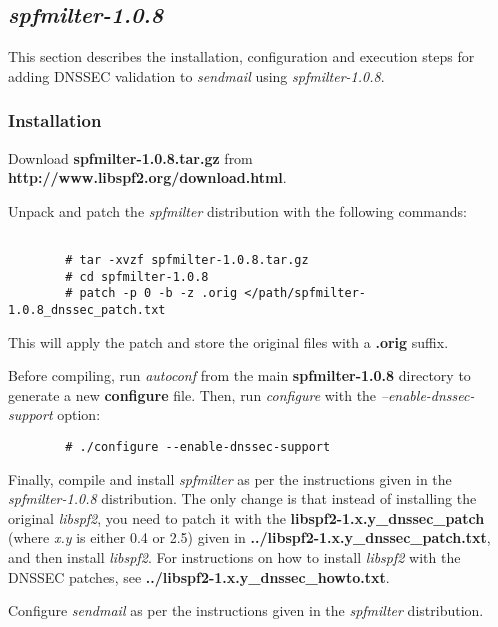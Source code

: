 \documentclass[12pt]{article}
\newcommand{\cmd}[1]{{\em #1}}
\newcommand{\lib}[1]{{\em #1}}
\newcommand{\path}[1]{{\bf #1}}
\newcommand{\url}[1]{{\bf #1}}
\begin{document}

\subsection{\cmd{spfmilter-1.0.8}}

This section describes the installation, configuration and execution steps
for adding DNSSEC validation to \cmd{sendmail} using \cmd{spfmilter-1.0.8}.


\subsubsection{Installation}

Download \path{spfmilter-1.0.8.tar.gz} from
\url{http://www.libspf2.org/download.html}.

Unpack and patch the \cmd{spfmilter} distribution with the following commands:

\begin{verbatim}

        # tar -xvzf spfmilter-1.0.8.tar.gz
        # cd spfmilter-1.0.8
        # patch -p 0 -b -z .orig </path/spfmilter-1.0.8_dnssec_patch.txt
\end{verbatim}

This will apply the patch and store the original files with a \path{.orig}
suffix.

Before compiling, run \cmd{autoconf} from the main \path{spfmilter-1.0.8}
directory to generate a new \path{configure} file.  Then, run \cmd{configure}
with the {\it --enable-dnssec-support} option:

\begin{verbatim}
        # ./configure --enable-dnssec-support
\end{verbatim}

Finally, compile and install \cmd{spfmilter} as per the instructions given
in the \cmd{spfmilter-1.0.8} distribution.  The only change is that instead
of installing the original \lib{libspf2}, you need to patch it with the
\path{libspf2-1.x.y\_dnssec\_patch} (where {\it x.y} is either 0.4 or 2.5)
given in \path{../libspf2-1.x.y\_dnssec\_patch.txt}, and then install
\lib{libspf2}.  For instructions on how to install \lib{libspf2} with the
DNSSEC patches, see \path{../libspf2-1.x.y\_dnssec\_howto.txt}.

Configure \cmd{sendmail} as per the instructions given in the \cmd{spfmilter}
distribution.
\end{document}
